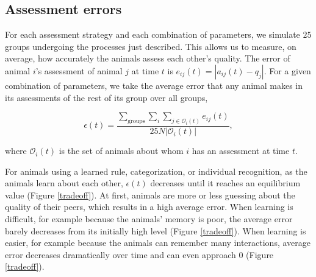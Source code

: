 \subsection{Assessment errors }
For each assessment strategy and each combination of parameters, we simulate $25$ groups undergoing the processes just described.  This allows us to measure, on average, how accurately the animals assess each other's quality. The error of animal $i$'s assessment of animal $j$ at time $t$ is $e_{ij}(t)=|a_{ij}(t)-q_j|$. For a given combination of parameters, we take the average error that any animal makes in its assessments of the rest of its group over all groups, 
\begin{linenomath*}
\begin{equation*}
\epsilon(t) = \frac{\sum_{\text{groups}}\sum_i\sum_{j\in \mathscr{O}_i(t)}e_{ij}(t)}{25N|\mathscr{O}_i(t)|},
\end{equation*}
\end{linenomath*}
where $\mathscr{O}_i(t)$ is the set of animals about whom $i$ has an assessment at time $t$.

For animals using a learned rule, categorization, or individual recognition, as the animals learn about each other, $\epsilon(t)$ decreases until it reaches an equilibrium value (Figure \ref{tradeoff}). At first, animals are more or less guessing about the quality of their peers, which results in a high average error. When learning is difficult, for example because the animals' memory is poor, the average error barely decreases from its initially high level (Figure \ref{tradeoff}). When learning is easier, for example because the animals can remember many interactions, average error decreases dramatically over time and can even approach $0$ (Figure \ref{tradeoff}).  

